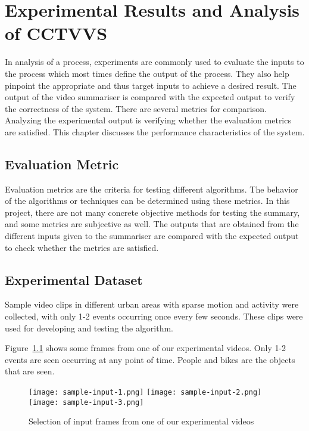\chapter{Experimental Results and Analysis of CCTVVS}

In analysis of a process, experiments are commonly used to evaluate the inputs
to the process which most times define the output of the process. They also
help pinpoint the appropriate and thus target inputs to achieve a desired
result. The output of the video summariser is compared with the expected output
to verify the correctness of the system. There are several metrics for
comparison. Analyzing the experimental output is verifying whether the
evaluation metrics are satisfied. This chapter discusses the performance
characteristics of the system.

\section{Evaluation Metric}

Evaluation metrics are the criteria for testing different algorithms. The
behavior of the algorithms or techniques can be determined using these metrics.
In this project, there are not many concrete objective methods for testing the
summary, and some metrics are subjective as well. The outputs that are
obtained from the different inputs given to the summariser are compared with
the expected output to check whether the metrics are satisfied.

\section{Experimental Dataset}

Sample video clips in different urban areas with sparse motion and activity were
collected, with only 1-2 events occurring once every few seconds. These clips
were used for developing and testing the algorithm.

Figure~\ref{img:sample-input} shows some frames from one of our experimental
videos. Only 1-2 events are seen occurring at any point of time. People and
bikes are the objects that are seen.

\begin{figure}[!htb]
        \texttt{[image: sample-input-1.png]}
    \endminipage\hfill
        \texttt{[image: sample-input-2.png]}
    \endminipage\hfill
        \texttt{[image: sample-input-3.png]}
    \endminipage
    \caption{Selection of input frames from one of our experimental videos}
    \label{img:sample-input}
\end{figure}

